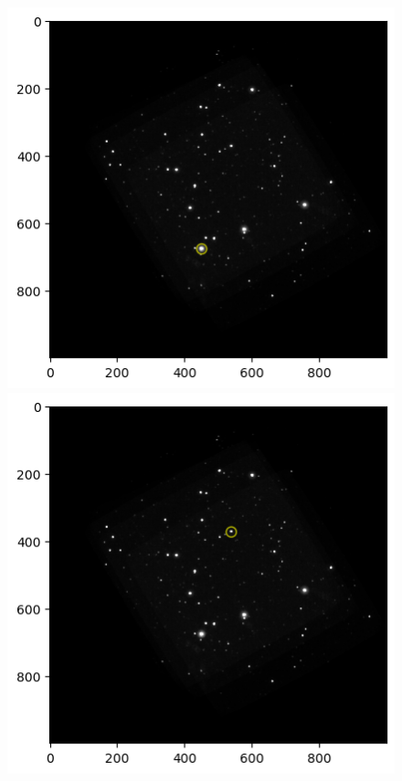 \documentclass{article}
\begin{document}
\begin{figure}[h]
  \begin{minipage}[b]{.45\linewidth} 
    \centering
    \includegraphics[scale=0.5]{star_333.png}
  \end{minipage}\hfill
  \begin{minipage}[b]{.45\linewidth}
    \centering
    \includegraphics[scale=0.5]{star_109.png}
  \end{minipage}
\end{figure}
\end{document}

